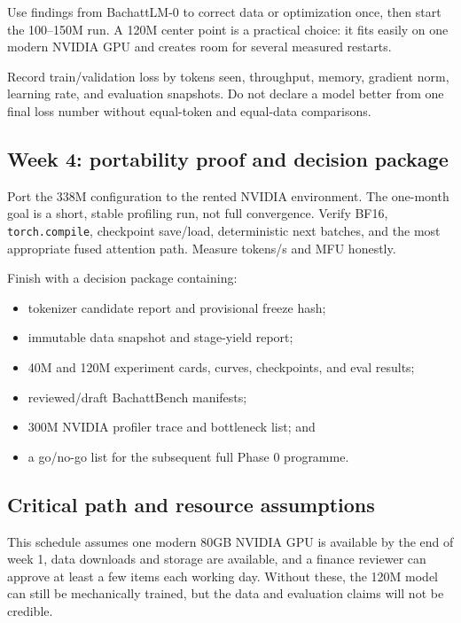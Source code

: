 Use findings from BachattLM-0 to correct data or optimization once, then start
the 100--150M run. A 120M center point is a practical choice: it fits easily on
one modern NVIDIA GPU and creates room for several measured restarts.

Record train/validation loss by tokens seen, throughput, memory, gradient norm,
learning rate, and evaluation snapshots. Do not declare a model better from one
final loss number without equal-token and equal-data comparisons.

\subsection{Week 4: portability proof and decision package}

Port the 338M configuration to the rented NVIDIA environment. The one-month
goal is a short, stable profiling run, not full convergence. Verify BF16,
\texttt{torch.compile}, checkpoint save/load, deterministic next batches, and
the most appropriate fused attention path. Measure tokens/s and MFU honestly.

Finish with a decision package containing:

\begin{itemize}
  \setlength{\itemsep}{0pt}
  \item tokenizer candidate report and provisional freeze hash;
  \item immutable data snapshot and stage-yield report;
  \item 40M and 120M experiment cards, curves, checkpoints, and eval results;
  \item reviewed/draft BachattBench manifests;
  \item 300M NVIDIA profiler trace and bottleneck list; and
  \item a go/no-go list for the subsequent full Phase 0 programme.
\end{itemize}

\subsection{Critical path and resource assumptions}

This schedule assumes one modern 80GB NVIDIA GPU is available by the end of
week 1, data downloads and storage are available, and a finance reviewer can
approve at least a few items each working day. Without these, the 120M model
can still be mechanically trained, but the data and evaluation claims will not
be credible.

